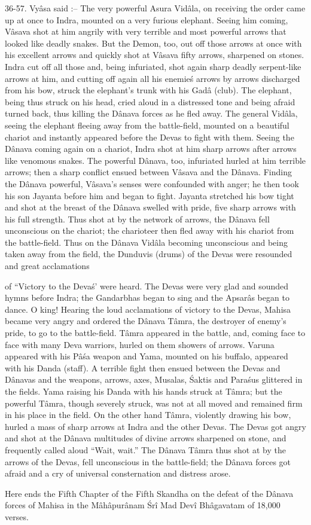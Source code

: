 36-57. Vy\^asa said :-- The very powerful Asura Vid\^ala, on receiving the order came up at once to Indra, mounted on a very furious elephant. Seeing him coming, V\^asava shot at him angrily with very terrible and most powerful arrows that looked like deadly snakes. But the Demon, too, out off those arrows at once with his excellent arrows and quickly shot at V\^asava fifty arrows, sharpened on stones. Indra cut off all those and, being infuriated, shot again sharp deadly serpent-like arrows at him, and cutting off again all his enemie\'s arrows by arrows discharged from his bow, struck the elephant's trunk with his Gad\^a (club). The elephant, being thus struck on his head, cried aloud in a distressed tone and being afraid turned back, thus killing the D\^anava forces as he fled away. The general Vid\^ala, seeing the elephant fleeing away from the battle-field, mounted on a beautiful chariot and instantly appeared before the Devas to fight with them. Seeing the D\^anava coming again on a chariot, Indra shot at him sharp arrows after arrows like venomous snakes. The powerful D\^anava, too, infuriated hurled at him terrible arrows; then a sharp conflict ensued between V\^asava and the D\^anava. Finding the D\^anava powerful, V\^asava's senses were confounded with anger; he then took his son Jayanta before him and began to fight. Jayanta stretched his bow tight and shot at the breast of the D\^anava swelled with pride, five sharp arrows with his full strength. Thus shot at by the network of arrows, the D\^anava fell unconscious on the chariot; the charioteer then fled away with his chariot from the battle-field. Thus on the D\^anava Vid\^ala becoming unconscious and being taken away from the field, the Dunduvis (drums) of the Devas were resounded and great acclamations

of ``Victory to the Deva\'s' were heard. The Devas were very glad and sounded hymns before Indra; the Gandarbhas began to sing and the Apsar\^as began to dance. O king! Hearing the loud acclamations of victory to the Devas, Mahisa became very angry and ordered the D\^anava T\^amra, the destroyer of enemy's pride, to go to the battle-field. T\^amra appeared in the battle, and, coming face to face with many Deva warriors, hurled on them showers of arrows. Varuna appeared with his P\^a\'sa weapon and Yama, mounted on his buffalo, appeared with his Danda (staff). A terrible fight then ensued between the Devas and D\^anavas and the weapons, arrows, axes, Musalas, \'Saktis and Para\'sus glittered in the fields. Yama raising his Danda with his hands struck at T\^amra; but the powerful T\^amra, though severely struck, was not at all moved and remained firm in his place in the field. On the other hand T\^amra, violently drawing his bow, hurled a mass of sharp arrows at Indra and the other Devas. The Devas got angry and shot at the D\^anava multitudes of divine arrows sharpened on stone, and frequently called aloud ``Wait, wait.'' The D\^anava T\^amra thus shot at by the arrows of the Devas, fell unconscious in the battle-field; the D\^anava forces got afraid and a cry of universal consternation and distress arose.

Here ends the Fifth Chapter of the Fifth Skandha on the defeat of the D\^anava forces of Mahisa in the M\^ah\^apur\^anam \'Sr\^i Mad Dev\^i Bh\^agavatam of 18,000 verses.